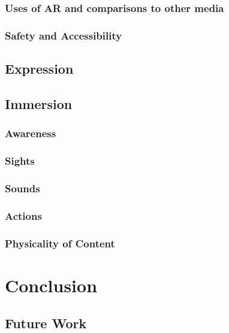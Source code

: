 \subsubsection{Uses of AR and comparisons to other media}\label{sec: polaris-feedback-adoption-uses}
\subsubsection{Safety and Accessibility}\label{sec: polaris-feedback-adoption-safety}

\subsection{Expression}\label{sec: polaris-feedback-expression}

\subsection{Immersion}\label{sec: polaris-feedback-immersion}
\subsubsection{Awareness}\label{sec: polaris-feedback-immersion-awareness}
\subsubsection{Sights}\label{sec: polaris-feedback-immersion-sights}
\subsubsection{Sounds}\label{sec: polaris-feedback-immersion-sounds}
\subsubsection{Actions}\label{sec: polaris-feedback-immersion-actions}
\subsubsection{Physicality of Content}\label{sec: polaris-feedback-immersion-physicality}



\section{Conclusion}\label{sec: polaris-conclusion}
\subsection{Future Work}\label{sec: polaris-conclusion-future}



